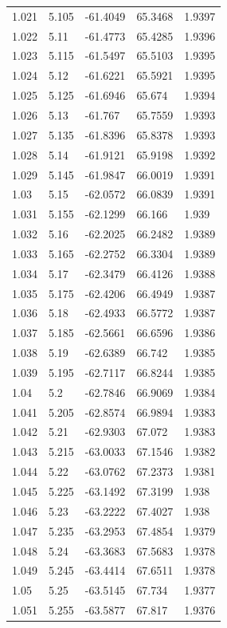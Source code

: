 \begin{tabular}{lllll}
1.021 & 5.105 & -61.4049 & 65.3468 & 1.9397 \\
1.022 & 5.11 & -61.4773 & 65.4285 & 1.9396 \\
1.023 & 5.115 & -61.5497 & 65.5103 & 1.9395 \\
1.024 & 5.12 & -61.6221 & 65.5921 & 1.9395 \\
1.025 & 5.125 & -61.6946 & 65.674 & 1.9394 \\
1.026 & 5.13 & -61.767 & 65.7559 & 1.9393 \\
1.027 & 5.135 & -61.8396 & 65.8378 & 1.9393 \\
1.028 & 5.14 & -61.9121 & 65.9198 & 1.9392 \\
1.029 & 5.145 & -61.9847 & 66.0019 & 1.9391 \\
1.03 & 5.15 & -62.0572 & 66.0839 & 1.9391 \\
1.031 & 5.155 & -62.1299 & 66.166 & 1.939 \\
1.032 & 5.16 & -62.2025 & 66.2482 & 1.9389 \\
1.033 & 5.165 & -62.2752 & 66.3304 & 1.9389 \\
1.034 & 5.17 & -62.3479 & 66.4126 & 1.9388 \\
1.035 & 5.175 & -62.4206 & 66.4949 & 1.9387 \\
1.036 & 5.18 & -62.4933 & 66.5772 & 1.9387 \\
1.037 & 5.185 & -62.5661 & 66.6596 & 1.9386 \\
1.038 & 5.19 & -62.6389 & 66.742 & 1.9385 \\
1.039 & 5.195 & -62.7117 & 66.8244 & 1.9385 \\
1.04 & 5.2 & -62.7846 & 66.9069 & 1.9384 \\
1.041 & 5.205 & -62.8574 & 66.9894 & 1.9383 \\
1.042 & 5.21 & -62.9303 & 67.072 & 1.9383 \\
1.043 & 5.215 & -63.0033 & 67.1546 & 1.9382 \\
1.044 & 5.22 & -63.0762 & 67.2373 & 1.9381 \\
1.045 & 5.225 & -63.1492 & 67.3199 & 1.938 \\
1.046 & 5.23 & -63.2222 & 67.4027 & 1.938 \\
1.047 & 5.235 & -63.2953 & 67.4854 & 1.9379 \\
1.048 & 5.24 & -63.3683 & 67.5683 & 1.9378 \\
1.049 & 5.245 & -63.4414 & 67.6511 & 1.9378 \\
1.05 & 5.25 & -63.5145 & 67.734 & 1.9377 \\
1.051 & 5.255 & -63.5877 & 67.817 & 1.9376 \\

\end{tabular}
